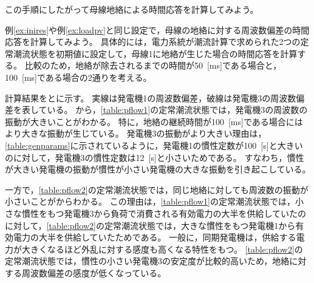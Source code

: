 \documentclass[tombow,dvipdfmx]{corona-a5-1.1}
\begin{document}
この手順にしたがって母線地絡による時間応答を計算してみよう。

\begin{例}[母線地絡に対する電力系統モデルの時間応答]\label{ex:busflt}
例\ref{ex:inires}や例\ref{ex:loadpv}と同じ設定で，母線の地絡に対する周波数偏差の時間応答を計算してみよう。
具体的には，電力系統が潮流計算で求められた2つの定常潮流状態を初期値に設定して，母線1に地絡が生じた場合の時間応答を計算する。
比較のため，地絡が除去されるまでの時間が50~[ms]である場合と，100~[ms]である場合の2通りを考える。

計算結果をとに示す。
実線は発電機1の周波数偏差，破線は発電機3の周波数偏差を表している。
から，\ref{table:pflow1}の定常潮流状態では，発電機3の周波数の振動が大きいことがわかる。
特に，地絡の継続時間が100~[ms]である場合にはより大きな振動が生じている。
発電機3の振動がより大きい理由は，\ref{table:genparams}に示されているように，発電機1の慣性定数が100~[s]と大きいのに対して，発電機3の慣性定数は12~[s]と小さいためである。
すなわち，慣性が大きい発電機の振動が慣性が小さい発電機の大きな振動を引き起こしている。

一方で，\ref{table:pflow2}の定常潮流状態では，同じ地絡に対しても周波数の振動が小さいことがからわかる。
この理由は，\ref{table:pflow1}の定常潮流状態では，小さな慣性をもつ発電機3から負荷で消費される有効電力の大半を供給していたのに対して，\ref{table:pflow2}の定常潮流状態では，大きな慣性をもつ発電機1から有効電力の大半を供給していたためである。
一般に，同期発電機は，供給する電力が大きくなるほど外乱に対する感度も高くなる特性をもつ。
\ref{table:pflow2}の定常潮流状態では，慣性の小さい発電機3の安定度が比較的高いため，地絡に対する周波数偏差の感度が低くなっている。
\end{例}
\end{document}
